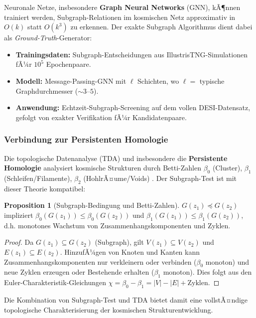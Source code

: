 ﻿\documentclass[a4paper,12pt]{article}
\theoremstyle{definition}
\newtheorem{proposition}{Proposition}[section]
\theoremstyle{remark}
\begin{document}
Neuronale Netze, insbesondere \textbf{Graph Neural Networks} (GNN),
kÃ¶nnen trainiert werden, Subgraph-Relationen im kosmischen Netz
approximativ in $O(k)$ statt $O(k^3)$ zu erkennen. Der exakte
Subgraph Algorithmus dient dabei als \textit{Ground-Truth}-Generator:

\begin{itemize}
  \item \textbf{Trainingsdaten:} Subgraph-Entscheidungen aus IllustrisTNG-Simulationen
    fÃ¼r $10^5$ Epochenpaare.
  \item \textbf{Modell:} Message-Passing-GNN mit $\ell$ Schichten, wo
    $\ell = $ typische Graphdurchmesser ($\sim 3$--$5$).
  \item \textbf{Anwendung:} Echtzeit-Subgraph-Screening auf dem vollen
    DESI-Datensatz, gefolgt von exakter Verifikation fÃ¼r Kandidatenpaare.
\end{itemize}

\subsubsection*{Verbindung zur Persistenten Homologie}

Die topologische Datenanalyse (TDA) und insbesondere die
\textbf{Persistente Homologie} analysiert kosmische Strukturen
durch Betti-Zahlen $\beta_0$ (Cluster), $\beta_1$ (Schleifen/Filamente),
$\beta_2$ (HohlrÃ¤ume/Voids) \cite{weinberg2013}. Der Subgraph-Test
ist mit dieser Theorie kompatibel:

\begin{proposition}[Subgraph-Bedingung und Betti-Zahlen]
  $G(z_1) \preceq G(z_2)$ impliziert
  $\beta_0(G(z_1)) \leq \beta_0(G(z_2))$ und
  $\beta_1(G(z_1)) \leq \beta_1(G(z_2))$, d.h. monotones Wachstum
  von Zusammenhangskomponenten und Zyklen.
\end{proposition}

\begin{proof}
  Da $G(z_1) \subseteq G(z_2)$ (Subgraph), gilt $V(z_1) \subseteq V(z_2)$
  und $E(z_1) \subseteq E(z_2)$. HinzufÃ¼gen von Knoten und Kanten kann
  Zusammenhangskomponenten nur verkleinern oder verbinden ($\beta_0$
  monoton) und neue Zyklen erzeugen oder Bestehende erhalten
  ($\beta_1$ monoton). Dies folgt aus den Euler-Charakteristik-Gleichungen
  $\chi = \beta_0 - \beta_1 = |V| - |E| + \text{Zyklen}$.
\end{proof}

Die Kombination von Subgraph-Test und TDA bietet damit eine vollstÃ¤ndige
topologische Charakterisierung der kosmischen Strukturentwicklung.
\end{document}
